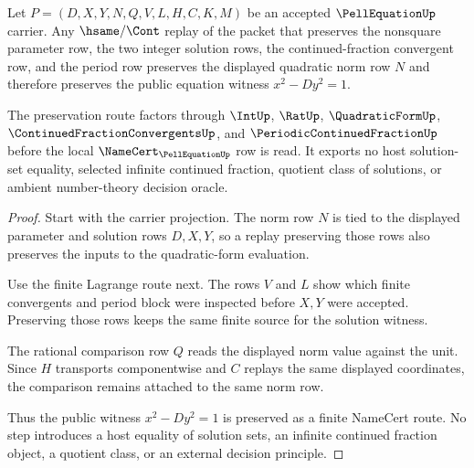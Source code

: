 \begin{theorem}
\label{thm:pell-equation-norm-preservation}
Let $P=(D,X,Y,N,Q,V,L,H,C,K,M)$ be an accepted $\PellEquationUp$ carrier. Any $\hsame/\Cont$ replay of the packet that preserves the nonsquare parameter row, the two integer solution rows, the continued-fraction convergent row, and the period row preserves the displayed quadratic norm row $N$ and therefore preserves the public equation witness $x^2-Dy^2=1$.

The preservation route factors through $\IntUp$, $\RatUp$, $\QuadraticFormUp$, $\ContinuedFractionConvergentsUp$, and $\PeriodicContinuedFractionUp$ before the local $\NameCert_{\PellEquationUp}$ row is read. It exports no host solution-set equality, selected infinite continued fraction, quotient class of solutions, or ambient number-theory decision oracle.
\end{theorem}
\begin{proof}
Start with the carrier projection. The norm row $N$ is tied to the displayed parameter and solution rows $D,X,Y$, so a replay preserving those rows also preserves the inputs to the quadratic-form evaluation.

Use the finite Lagrange route next. The rows $V$ and $L$ show which finite convergents and period block were inspected before $X,Y$ were accepted. Preserving those rows keeps the same finite source for the solution witness.

The rational comparison row $Q$ reads the displayed norm value against the unit. Since $H$ transports componentwise and $C$ replays the same displayed coordinates, the comparison remains attached to the same norm row.

Thus the public witness $x^2-Dy^2=1$ is preserved as a finite NameCert route. No step introduces a host equality of solution sets, an infinite continued fraction object, a quotient class, or an external decision principle.
\end{proof}


